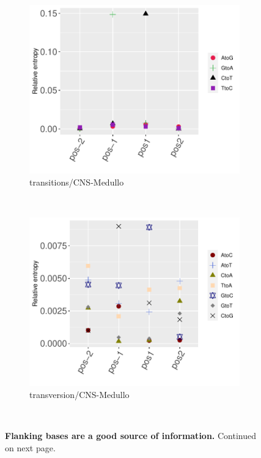 \begin{figure}[ht!]
    \begin{subfigure}{.5\textwidth}
    \includegraphics[scale=0.63]{graphics/nbr_transitions_CNS-Medullo.pdf}
    \caption{transitions/CNS-Medullo}
    \label{fig:transitions_cns-medullo}
    \end{subfigure}
    ~
    \begin{subfigure}{.5\textwidth}
    \includegraphics[scale=0.63]{graphics/nbr_transversion_CNS-Medullo.pdf}
    \caption{transversion/CNS-Medullo}
    \label{fig:transversion_cns-medullo}
    \end{subfigure} \\
    \caption{\textbf{Flanking bases are a good source of information.} Continued on next page.}
\end{figure}
